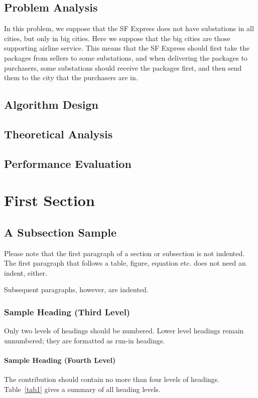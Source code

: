 \documentclass{llncs}
\begin{document}
\subsection{Problem Analysis}
In this problem, we suppose that the SF Express does not have substations in all cities, but only in big cities. Here we suppose that the big cities are those supporting airline service. 
This means that the SF Express should first take the packages from sellers to some substations, and when delivering the packages to purchasers, some substations should receive the packages first, and then send them to the city that the purchasers are in.
\subsection{Algorithm Design}
\subsection{Theoretical Analysis}
\subsection{Performance Evaluation}

\section{First Section}
\subsection{A Subsection Sample}
Please note that the first paragraph of a section or subsection is
not indented. The first paragraph that follows a table, figure,
equation etc. does not need an indent, either.

Subsequent paragraphs, however, are indented.

\subsubsection{Sample Heading (Third Level)} Only two levels of
headings should be numbered. Lower level headings remain unnumbered;
they are formatted as run-in headings.

\paragraph{Sample Heading (Fourth Level)}
The contribution should contain no more than four levels of
headings. Table~\ref{tab1} gives a summary of all heading levels.
\end{document}
